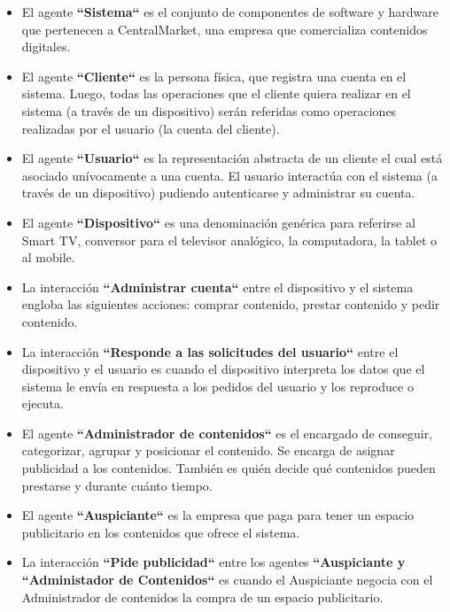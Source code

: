 \documentclass[11pt, a4paper, spanish]{article}
\begin{document}
\begin{itemize}

	\item  {El agente \textbf{``Sistema``} es el conjunto de componentes de software y hardware que pertenecen a CentralMarket, una empresa que 
	comercializa contenidos digitales.}

	\item El agente \textbf{``Cliente``} es la persona f\'isica, que registra una cuenta en el sistema. Luego, todas las operaciones que el cliente 
	quiera realizar en el sistema (a trav\'es de un dispositivo) ser\'an referidas como operaciones realizadas por el usuario (la cuenta del cliente).

	\item El agente \textbf{``Usuario``} es la representaci\'on abstracta de un cliente el cual est\'a asociado un\'ivocamente a una 	
	cuenta. El usuario interact\'ua con el sistema (a trav\'es de un dispositivo) pudiendo autenticarse y administrar su cuenta.

	\item El agente \textbf{``Dispositivo``} es una denominaci\'on gen\'erica para referirse al Smart TV, conversor para el televisor anal\'ogico, 
	la computadora, la tablet o al mobile. 

	\item La interacci\'on \textbf{``Administrar cuenta``} entre el dispositivo y el sistema engloba las siguientes acciones: comprar contenido, 
	prestar contenido y pedir contenido.

	\item La interacci\'on \textbf{``Responde a las solicitudes del usuario``} entre el dispositivo y el usuario es cuando el dispositivo 
	interpreta los datos que el sistema le env\'ia en respuesta a los pedidos del usuario y los reproduce o ejecuta.	 
	   
	\item El agente \textbf{``Administrador de contenidos``} es el encargado de conseguir, categorizar, agrupar y posicionar el contenido. Se 
	encarga de asignar publicidad a los contenidos. Tambi\'en es qui\'en decide qu\'e contenidos pueden prestarse y durante cu\'anto tiempo.

	\item El agente \textbf{``Auspiciante``} es la empresa que paga para tener un espacio publicitario en los contenidos que ofrece el sistema.

	\item La interacci\'on \textbf{``Pide publicidad``} entre los agentes \textbf{``Auspiciante y ``Administador de Contenidos``} es cuando el 
	Auspiciante negocia con el Administrador de contenidos la compra de un espacio publicitario.
	  

\end{itemize}
\end{document}

